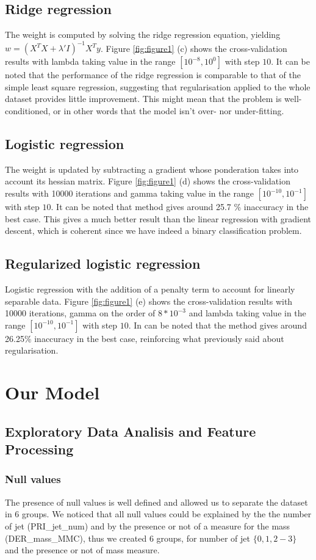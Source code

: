 \documentclass[10pt,conference,compsocconf]{IEEEtran}
\begin{document}
\subsection{Ridge regression}
The weight is computed by solving the ridge regression equation, yielding $w = (X^{T}X + \lambda'I)^{-1}X^{T}y$.
Figure \ref{fig:figure1} (c) shows the cross-validation results with lambda taking value in the range $[10^{-8}, 10^{0}]$ with step $10$. It can be noted that the performance of the ridge regression is comparable to that of the simple least square regression, suggesting that regularisation applied to the whole dataset provides little improvement. This might mean that the problem is well-conditioned, or in other words that the model isn't over- nor under-fitting.
\subsection{Logistic regression}
The weight is updated by subtracting a gradient whose ponderation takes into
account its hessian matrix. Figure \ref{fig:figure1} (d) shows the
cross-validation results with 10000 iterations and gamma taking value in the
range $[10^{-10}, 10^{-1}]$ with step $10$. It can be noted that method gives
around 25.7 \% inaccuracy in the best case. This gives a much better result than
the linear regression with gradient descent, which is coherent since we have
indeed a binary classification problem.
\subsection{Regularized logistic regression}
Logistic regression with the addition of a penalty term to account for linearly separable data. Figure \ref{fig:figure1} (e) shows the cross-validation results with 10000 iterations, gamma on the order of $8*10^{-3}$ and lambda taking value in the range $[10^{-10}, 10^{-1}]$ with step $10$. In can be noted that the method gives around 26.25\% inaccuracy in the best case, reinforcing what previously said about regularisation.
\section{Our Model}
\subsection{Exploratory Data Analisis and Feature Processing}
\subsubsection{Null values}
The presence of null values is well defined and allowed us to separate the
dataset in 6 groups. We noticed that all null values could be
explained by the the number of jet (PRI\_jet\_num) and by the presence or not of a
measure for the mass (DER\_mass\_MMC), thus we created 6 groups, for number of jet
$\lbrace 0, 1, 2-3 \rbrace$ and the presence or not of mass measure.
\end{document}
